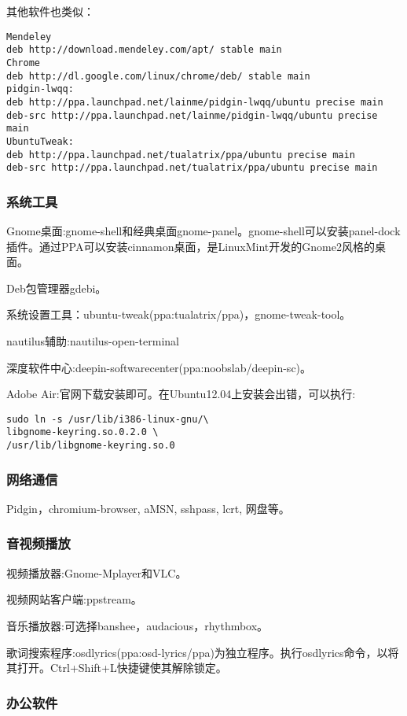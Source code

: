 其他软件也类似：
\begin{lstlisting}
Mendeley
deb http://download.mendeley.com/apt/ stable main 
Chrome
deb http://dl.google.com/linux/chrome/deb/ stable main
pidgin-lwqq:
deb http://ppa.launchpad.net/lainme/pidgin-lwqq/ubuntu precise main
deb-src http://ppa.launchpad.net/lainme/pidgin-lwqq/ubuntu precise main
UbuntuTweak:
deb http://ppa.launchpad.net/tualatrix/ppa/ubuntu precise main
deb-src http://ppa.launchpad.net/tualatrix/ppa/ubuntu precise main
\end{lstlisting}

\subsubsection{系统工具}
Gnome桌面:gnome-shell和经典桌面gnome-panel。gnome-shell可以安装panel-dock插件。通过PPA可以安装cinnamon桌面，是LinuxMint开发的Gnome2风格的桌面。

Deb包管理器gdebi。

系统设置工具：ubuntu-tweak(ppa:tualatrix/ppa)，gnome-tweak-tool。

nautilus辅助:nautilus-open-terminal

深度软件中心:deepin-softwarecenter(ppa:noobslab/deepin-sc)。

Adobe Air:官网下载安装即可。在Ubuntu12.04上安装会出错，可以执行:
\begin{verbatim}
sudo ln -s /usr/lib/i386-linux-gnu/\
libgnome-keyring.so.0.2.0 \
/usr/lib/libgnome-keyring.so.0
\end{verbatim}

\subsubsection{网络通信}
Pidgin，chromium-browser, aMSN, sshpass, lcrt, 网盘等。

\subsubsection{音视频播放}
视频播放器:Gnome-Mplayer和VLC。

视频网站客户端:ppstream。

音乐播放器:可选择banshee，audacious，rhythmbox。

歌词搜索程序:osdlyrics(ppa:osd-lyrics/ppa)为独立程序。执行osdlyrics命令，以将其打开。Ctrl+Shift+L快捷键使其解除锁定。

\subsubsection{办公软件}

